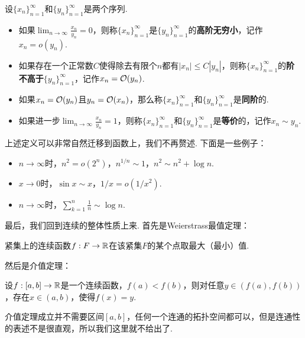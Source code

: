 \begin{definition}[阶，无穷小，等价]
    设$\{x_n\}_{n=1}^\infty$和$\{y_n\}_{n=1}^\infty$是两个序列. 
\begin{itemize}
    \item  如果$\lim_{n\to\infty}\frac{x_n}{y_n}=0$，则称$\{x_n\}_{n=1}^\infty$是$\{y_n\}_{n=1}^\infty$的\textbf{高阶无穷小}，记作$x_n=o(y_n)$.
    \item 如果存在一个正常数$C$使得除去有限个$n$都有$|x_n|\leq C |y_n|$，则称$\{x_n\}_{n=1}^\infty$的\textbf{阶不高于}$\{y_n\}_{n=1}^\infty$，记作$x_n=\mathcal{O}(y_n)$.
    \item 如果$x_n=\mathcal{O}(y_n)$且$y_n=\mathcal{O}(x_n)$，那么称$\{x_n\}_{n=1}^\infty$和$\{y_n\}_{n=1}^\infty$是\textbf{同阶}的.
    \item 如果进一步$\lim_{n\to\infty}\frac{x_n}{y_n}=1$，则称$\{x_n\}_{n=1}^\infty$和$\{y_n\}_{n=1}^\infty$是\textbf{等价}的，记作$x_n\sim y_n$.
\end{itemize}
\end{definition}

上述定义可以非常自然迁移到函数上，我们不再赘述. 下面是一些例子：

\begin{example}
\begin{itemize}
    \item $n\to\infty$时，$n^2=o(2^n)$，$n^{1/n}\sim 1$，$n^2\sim n^2+\log n$.
    \item $x\to 0$时，$\sin x\sim x$，$1/x=o(1/x^2)$. 
    \item $n\to\infty$时，$\sum_{k=1}^n\frac{1}{n}\sim\log n$.
\end{itemize}
\end{example}

最后，我们回到连续的整体性质上来. 首先是Weierstrass最值定理：

\begin{theorem}[Weierstrass最值定理]\label{theorem:weierstrass}
    紧集上的连续函数$f:F\to\mathbb{R}$在该紧集$F$的某个点取最大（最小）值. 
\end{theorem}

然后是介值定理：
\begin{theorem}[介值定理]\label{theorem:intermediate}
    设$f:[a,b]\to\mathbb{R}$是一个连续函数，$f(a)<f(b)$，则对任意$y\in(f(a),f(b))$，存在$x\in(a,b)$，使得$f(x)=y$.
\end{theorem}

介值定理成立并不需要区间$[a,b]$，任何一个连通的拓扑空间都可以，但是连通性的表述不是很直观，所以我们这里就不给出了. 


